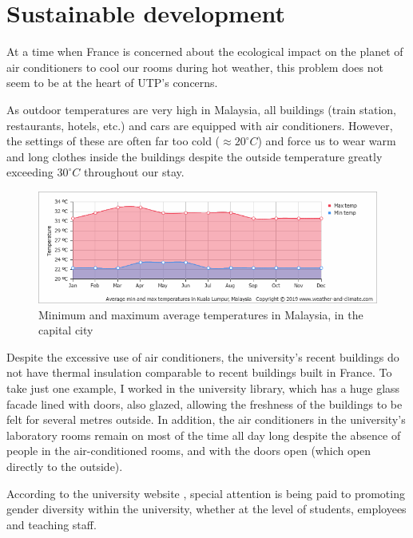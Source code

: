 \chapter{Sustainable development}

At a time when France is concerned about the ecological impact on the planet of air conditioners to cool our rooms during hot weather, this problem does not seem to be at the heart of UTP's concerns.

As outdoor temperatures are very high in Malaysia, all buildings (train station, restaurants, hotels, etc.) and cars are equipped with air conditioners. However, the settings of these are often far too cold ($\approx 20^{\circ}C$) and force us to wear warm and long clothes inside the buildings despite the outside temperature greatly exceeding $30^{\circ}C$ throughout our stay.

\begin{figure}[h]
  \includegraphics[width=1\linewidth]{content/imgs/temp.png}
  \caption{Minimum and maximum average temperatures in Malaysia, in the capital city}
  \label{fig:climate}
\end{figure}

Despite the excessive use of air conditioners, the university's recent buildings do not have thermal insulation comparable to recent buildings built in France. To take just one example, I worked in the university library, which has a huge glass facade lined with doors, also glazed, allowing the freshness of the buildings to be felt for several metres outside. In addition, the air conditioners in the university's laboratory rooms remain on most of the time all day long despite the absence of people in the air-conditioned rooms, and with the doors open (which open directly to the outside).

According to the university website \cite{utp_gender}, special attention is being paid to promoting gender diversity within the university, whether at the level of students, employees and teaching staff.
